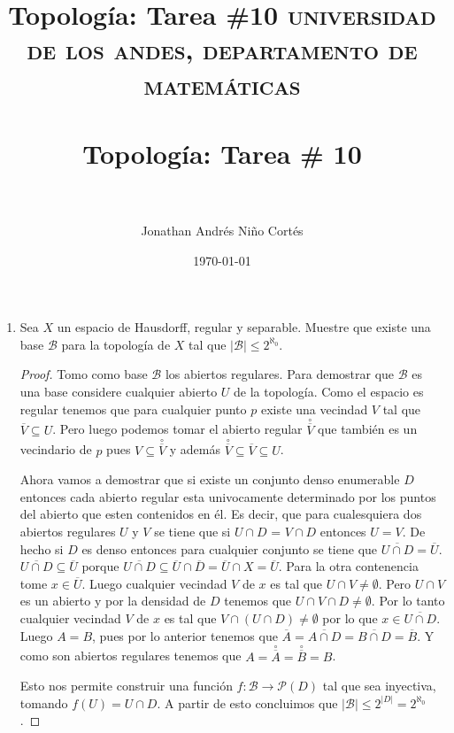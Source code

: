 \documentclass[paper=letter, fontsize=11pt]{scrartcl} %
\title{Topología: Tarea \#10}
\title{	
\normalfont \normalsize 
\textsc{universidad de los andes, departamento de matemáticas} \\ [25pt] %
\horrule{0.5pt} \\[0.4cm] %
\huge Topología: Tarea \# 10 \\ %
\horrule{2pt} \\[0.5cm] %
}
\author{Jonathan Andrés Niño Cortés} %
\date{\normalsize\today} %
\numberwithin{equation}{section} %
\numberwithin{figure}{section} %
\numberwithin{table}{section} %
\begin{document}
\maketitle
\begin{enumerate}
\item Sea $ X $ un espacio de Hausdorff, regular y separable. Muestre que existe una base $ \mathcal{B} $ para la topología de $ X $ tal que $ |\mathcal{B}|\leq 2^{\aleph_0} $.

\begin{proof}
Tomo como base $ \mathcal{B} $ los abiertos regulares. Para demostrar que $ \mathcal{B} $ es una base considere cualquier abierto $ U $ de la topología. Como el espacio es regular tenemos que para cualquier punto $ p $ existe una vecindad $ V $ tal que $ \overline{V} \subseteq U $. Pero luego podemos tomar el abierto regular $ \overset{\circ}{\overline{V}} $ que también es un vecindario de $ p $ pues $ V \subseteq \overset{\circ}{\overline{V}} $ y además $ \overset{\circ}{\overline{V}} \subseteq \overline{V} \subseteq U $.

Ahora vamos a demostrar que si existe un conjunto denso enumerable $ D $ entonces cada abierto regular esta univocamente determinado por los puntos del abierto que esten contenidos en él. Es decir, que para cualesquiera dos abiertos regulares $ U $ y $ V $ se tiene que si $ U \cap D $ = $ V\cap D $ entonces $ U = V $. De hecho si $ D $ es denso entonces para cualquier conjunto se tiene que $ \overline{U \cap D} = \overline{U} $. $ \overline{U \cap D} \subseteq \overline{U} $ porque $ \overline{U\cap D} \subseteq \overline{U} \cap \overline{D} = \overline{U} \cap X = \overline{U} $. Para la otra contenencia tome $ x \in \overline{U} $. Luego cualquier vecindad $ V $ de $ x $ es tal que $ U \cap V \not = \emptyset $. Pero $ U \cap V $ es un abierto y por la densidad de $ D $ tenemos que $ U \cap V \cap D \not = \emptyset $. Por lo tanto cualquier vecindad $ V $ de $ x $ es tal que $ V \cap (U \cap D) \not = \emptyset $ por lo que $ x \in \overline{U \cap D} $. Luego $ A = B $, pues por lo anterior tenemos que $ \overline{A}=\overline{A \cap D} = \overline{B \cap D}= \overline{B} $. Y como son abiertos regulares tenemos que $ A = \overset{\circ}{\overline{A}} = \overset{\circ}{\overline{B}} = B $.

Esto nos permite construir una función $ f:\mathcal{B} \to \mathcal{P}(D)  $ tal que sea inyectiva, tomando $ f(U)=U\cap D $. A partir de esto concluimos que $ |\mathcal{B}|\leq 2^{|D|}=2^{\aleph_0} $.
\end{proof}


\end{enumerate}
\end{document}
